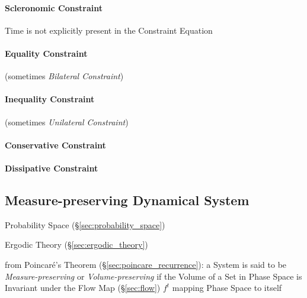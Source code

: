 \paragraph{Scleronomic Constraint}\label{sec:scleronomic_constraint}\hfill

Time is not explicitly present in the Constraint Equation



\paragraph{Equality Constraint}\label{sec:equality_constraint}\hfill

(sometimes \emph{Bilateral Constraint})



\paragraph{Inequality Constraint}\label{sec:inequality_constraint}\hfill

(sometimes \emph{Unilateral Constraint})



\paragraph{Conservative Constraint}\label{sec:conservative_constraint}\hfill

\paragraph{Dissipative Constraint}\label{sec:dissipative_constraint}\hfill



\subsection{Measure-preserving Dynamical System}
\label{sec:measure_preserving_system}

Probability Space (\S\ref{sec:probability_space})

\fist Ergodic Theory (\S\ref{sec:ergodic_theory})

from Poincar\'e's Theorem (\S\ref{sec:poincare_recurrence}): a System is said to
be \emph{Measure-preserving} or \emph{Volume-preserving} if the Volume of a Set
in Phase Space is Invariant under the Flow Map (\S\ref{sec:flow}) $f^t$ mapping
Phase Space to itself


